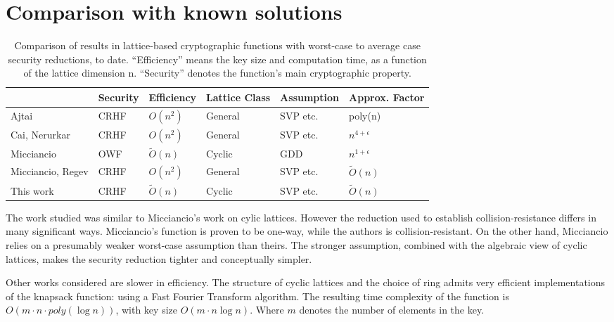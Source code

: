 \section{Comparison with known solutions}
	\begin{table}[H]
		\begin{tabular}{|m{2cm} | m{2.1cm} | m{2.3cm} | m{2.6cm} | m{3.1cm} | m{3cm}|}
			\hline
			\textbf{ } & \textbf{Security} & \textbf{Efficiency} & \textbf{Lattice Class} & \textbf{Assumption} & \textbf{Approx. Factor}\\
			\hline
			Ajtai & CRHF & $O(n^2)$ & General & SVP etc. & poly(n) \\ \hline
			Cai, Nerurkar & CRHF & $O(n^2)$ & General & SVP etc. & $n^{4+\epsilon}$ \\ \hline
			Micciancio \vspace{0.3cm} & OWF & $\tilde{O}(n)$ & Cyclic & GDD & $n^{1+\epsilon}$ \\ \hline
			Micciancio, Regev & CRHF & $O(n^2)$ & General & SVP etc. & $\tilde{O}(n)$ \\ \hline
			This \vspace{0.3cm} work& CRHF & $\tilde{O}(n)$ & Cyclic & SVP etc. & $\tilde{O}(n)$ \\
			\hline
		\end{tabular}
		\caption{Comparison of results in lattice-based cryptographic functions with worst-case to average case security reductions, to date. “Efficiency” means the key size and computation time, as a function of the lattice dimension n. “Security” denotes the function’s main cryptographic property.}
	\end{table}
The work studied was similar to Micciancio's work on cylic lattices. However the reduction used to establish collision-resistance differs in many significant ways. Micciancio’s function is proven to be one-way, while the authors is collision-resistant. On the other hand, Micciancio relies on a presumably weaker worst-case assumption than theirs. The stronger assumption, combined with the algebraic
view of cyclic lattices, makes the security reduction tighter and conceptually simpler.
\par
Other works considered are slower in efficiency. The structure of cyclic lattices and the choice of ring admits very efficient implementations of the knapsack function: using a Fast Fourier Transform algorithm. The resulting time complexity of the function is $O(m \cdot n \cdot poly(\log n))$, with key size $O(m \cdot n \log n)$. Where $m$ denotes the number of elements in the key.